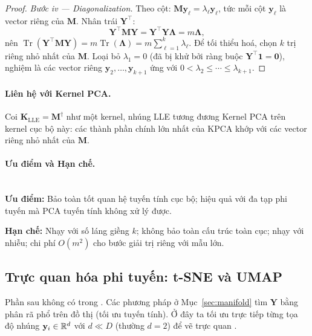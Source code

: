\begin{proof}
\textit{Bước iv — Diagonalization.}
Theo cột: $\mathbf{M}\mathbf{y}_\ell = \lambda_\ell\mathbf{y}_\ell$,
tức mỗi cột $\mathbf{y}_\ell$ là vector riêng của $\mathbf{M}$.
Nhân trái $\mathbf{Y}^\top$:
\begin{equation*}
  \mathbf{Y}^\top\mathbf{M}\mathbf{Y}
  = \mathbf{Y}^\top\mathbf{Y}\boldsymbol{\Lambda}
  = m\boldsymbol{\Lambda},
\end{equation*}
nên $\operatorname{Tr}(\mathbf{Y}^\top\mathbf{M}\mathbf{Y})
=m\operatorname{Tr}(\boldsymbol{\Lambda})=m\sum_{\ell=1}^k\lambda_\ell$.
Để tối thiểu hoá, chọn $k$ trị riêng nhỏ nhất của $\mathbf{M}$.
Loại bỏ $\lambda_1=0$ (đã bị khử bởi ràng buộc $\mathbf{Y}^\top\mathbf{1}=\mathbf{0}$),
nghiệm là các vector riêng $\mathbf{y}_2,\ldots,\mathbf{y}_{k+1}$ ứng với
$0<\lambda_2\le\cdots\le\lambda_{k+1}$.
\end{proof}
 
\paragraph{Liên hệ với Kernel PCA.}
Coi $\mathbf{K}_{\mathrm{LLE}}=\mathbf{M}^\dagger$ như một kernel,
nhúng LLE tương đương Kernel PCA trên kernel cục bộ này: các thành phần chính
lớn nhất của KPCA khớp với các vector riêng nhỏ nhất của $\mathbf{M}$.
 
\paragraph{Ưu điểm và Hạn chế.}\mbox{}\\[2pt]
\textbf{Ưu điểm:}
Bảo toàn tốt quan hệ tuyến tính cục bộ; hiệu quả với đa tạp phi tuyến mà
PCA tuyến tính không xử lý được.
 
\textbf{Hạn chế:}
Nhạy với số láng giềng $k$; không bảo toàn cấu trúc toàn cục; nhạy với
nhiễu; chi phí $O(m^2)$ cho bước giải trị riêng với mẫu lớn.
\subsection{Trực quan hóa phi tuyến: t-SNE và UMAP}
\label{sec:extension-viz}

\begin{extension}
Phần sau không có trong \cite{mohri2018foundations}. Các phương pháp ở Mục~\ref{sec:manifold} tìm $\mathbf{Y}$ bằng phân rã phổ trên đồ thị (tối ưu tuyến tính). Ở đây ta tối ưu trực tiếp từng tọa độ nhúng $\mathbf{y}_i \in \mathbb{R}^d$ với $d \ll D$ (thường $d=2$) để vẽ trực quan \cite{vandermaaten2008tsne,mcinnes2018umap}.
\end{extension}

